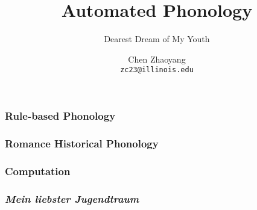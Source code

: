 \documentclass{beamer}
\title{Automated Phonology}
\subtitle{Dearest Dream of My Youth}
\author{Chen Zhaoyang \\ \texttt{zc23@illinois.edu}}
\begin{document}
\maketitle

\begin{frame}
  \frametitle{Rule-based Phonology}
\end{frame}

\begin{frame}
  \frametitle{Romance Historical Phonology}
\end{frame}

\begin{frame}
  \frametitle{Computation}
\end{frame}

\begin{frame}
  \frametitle{\emph{Mein liebster Jugendtraum}}
\end{frame}
\end{document}
